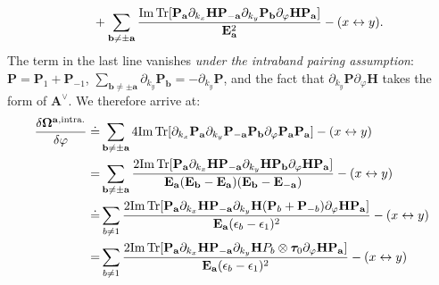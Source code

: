 \begin{subappendices}
\begin{align}
	&\qquad+\sum_{\mathbf b\neq \pm\mathbf a}\frac{ \mbox{Im\,Tr}[\mathbf P_{\mathbf a} \partial_{k_x} \mathbf H \mathbf P_{-\mathbf a} \partial_{k_y}\mathbf P_{\mathbf b}\partial_\varphi\mathbf H \mathbf P_{\mathbf a}]}{\mathbf E_{\mathbf a}^2}-(x\leftrightarrow y).\label{eq:Omega_middle}
\end{align}
The term in the last line vanishes \emph{under the intraband pairing assumption}: $\mathbf P =\mathbf P_1+\mathbf P_{-1}$, $\sum_{\mathbf b\neq \pm\mathbf a}\partial_{k_y}\mathbf P_{\mathbf b}=-\partial_{k_y}\mathbf P$, and the fact that $\partial_{k_y}\mathbf P\partial_\varphi \mathbf H$ takes the form of $\mathbf A^\vee$. We therefore arrive at:
\begin{align}
	\frac{\delta \boldsymbol \Omega ^{\mathbf a,\text{intra.}}}{\delta \varphi}\doteq&\sum_{\mathbf b\neq \pm\mathbf a}4 \mbox{Im\,Tr}[\partial_{k_x}\mathbf P_{\mathbf a}  \partial_{k_y}\mathbf P_{-\mathbf a} \mathbf P_{\mathbf b}\partial_\varphi\mathbf P_{\mathbf a}\mathbf P_{\mathbf a}]-(x\leftrightarrow y)\notag\\
	=&\sum_{\mathbf b\neq \pm\mathbf a}\frac{2 \mbox{Im\,Tr}[\mathbf P_{\mathbf a} \partial_{k_x}\mathbf H \mathbf P_{-\mathbf a} \partial_{k_y}\mathbf H\mathbf P_{\mathbf b}\partial_\varphi\mathbf H\mathbf P_{\mathbf a}]}{ \mathbf E_{\mathbf a} (\mathbf E_{\mathbf b}-\mathbf E_{\mathbf a})(\mathbf E_{\mathbf b}-\mathbf E_{-\mathbf a})}-(x\leftrightarrow y)\notag\\
	\doteq &\sum_{b\neq 1}\frac{2 \mbox{Im\,Tr}[\mathbf P_{\mathbf a} \partial_{k_x}\mathbf H \mathbf P_{-\mathbf a} \partial_{k_y}\mathbf H(\mathbf P_{b}+\mathbf P_{-b})\partial_\varphi\mathbf H\mathbf P_{\mathbf a}]}{ \mathbf E_{\mathbf a} (\epsilon_{b}-\epsilon_{1})^2}-(x\leftrightarrow y)\notag\\
	= &\sum_{b\neq 1}\frac{2 \mbox{Im\,Tr}[\mathbf P_{\mathbf a} \partial_{k_x}\mathbf H \mathbf P_{-\mathbf a} \partial_{k_y}\mathbf H P_b\otimes\boldsymbol\tau_0 \partial_\varphi\mathbf H\mathbf P_{\mathbf a}]}{ \mathbf E_{\mathbf a} (\epsilon_{b}-\epsilon_{1})^2}-(x\leftrightarrow y)
\end{align}


\end{subappendices}
